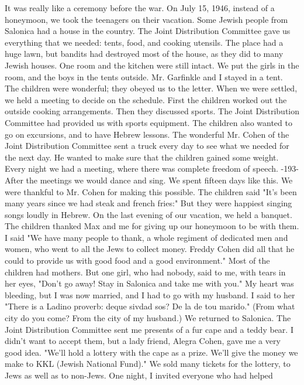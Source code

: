 It was really 
like a ceremony before the war.
On July 15, 1946, instead of a honeymoon, we took the teenagers on their vacation.
Some Jewish people from Salonica had a house in the country.
The Joint Distribution 
Committee gave us everything that we needed: tents, food, and cooking utensils.
The 
place had a huge lawn, but bandits had destroyed most of the house, as they did to many 
Jewish houses.
One room and the kitchen were still intact.
We put the girls in the room, and the boys in the tents outside.
Mr.
Garfinkle and 
I stayed in a tent.
The children were wonderful; they obeyed us to the letter.
When 
we were settled, we held a meeting to decide on the schedule.
First the children worked out the outside cooking arrangements.
Then they discussed sports.
The Joint Distribution Committee had provided us with sports equipment.
The children also wanted 
to go on excursions, and to have Hebrew lessons.
The wonderful Mr.
Cohen of the Joint Distribution Committee sent a truck every day 
to see what we needed for the next day.
He wanted to make sure that the children gained 
some weight.
Every night we had a meeting, where there was complete freedom of speech.
-193- 
After the meetings we would dance and sing.
We spent fifteen days like this.
We were 
thankful to Mr.
Cohen for making this possible.
The children said "It's been many years since we had steak and french fries:" But they were happiest singing songs loudly in Hebrew.
On the last evening of our vacation, we held a banquet.
The children thanked Max 
and me for giving up our honeymoon to be with them.
I said "We have many people to 
thank, a whole regiment of dedicated men and women, who went to all the Jews to collect 
money.
Freddy Cohen did all that he could to provide us with good food and a good environment."
Most of the children had mothers.
But one girl, who had nobody, said to me, with 
tears in her eyes, "Don't go away!
Stay in Salonica and take me with you."
My heart 
was bleeding, but I was now married, and I had to go with my husband.
I said to her 
"There is a Ladino proverb: deque sivdad sos?
De la de tou marido."
(From what city 
do you come?
From the city of my husband.)
We returned to Salonica.
The Joint Distribution Committee sent me presents of a 
fur cape and a teddy bear.
I didn't want to accept them, but a lady friend, Alegra Cohen, gave me a very good idea.
"We'll hold a lottery with the cape as a prize.
We'll 
give the money we make to KKL (Jewish National Fund)."
We sold many tickets for the 
lottery, to Jews as well as to non-Jews.
One night, I invited everyone who had helped 
